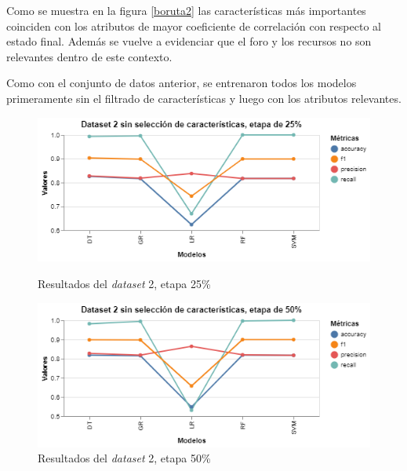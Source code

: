 Como se muestra en la figura \ref{boruta2} las características más importantes coinciden con los atributos de mayor coeficiente de correlación con respecto al estado final. Además se vuelve a evidenciar que el foro y los recursos no son relevantes dentro de este contexto. 


Como con el conjunto de datos anterior, se entrenaron todos los modelos primeramente sin el filtrado de características y luego con los atributos relevantes.  


\begin{figure}[htbp]
    \centering
    \begin{minipage}[t]{0.50\textwidth}
        \centering
        \includegraphics[width = \textwidth]{Graphics/dataset_2_25.png}
        \caption{Resultados del \textit{dataset} 2, etapa 25\%}
        \label{dataset2_25}
    \end{minipage}\hfill
    \begin{minipage}[t]{0.50\textwidth}
        \centering
        \includegraphics[width = \textwidth]{Graphics/dataset_2_50.png}
        \caption{Resultados del \textit{dataset} 2, etapa 50\%}
        \label{dataset2_50}
    \end{minipage}
\end{figure}

